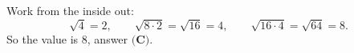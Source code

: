 Work from the inside out:
\[\sqrt4=2,\qquad \sqrt{8\cdot2}=\sqrt{16}=4,\qquad \sqrt{16\cdot4}=\sqrt{64}=8 .\]
So the value is $8$, answer $\boxed{\textbf{(C)}}$.
